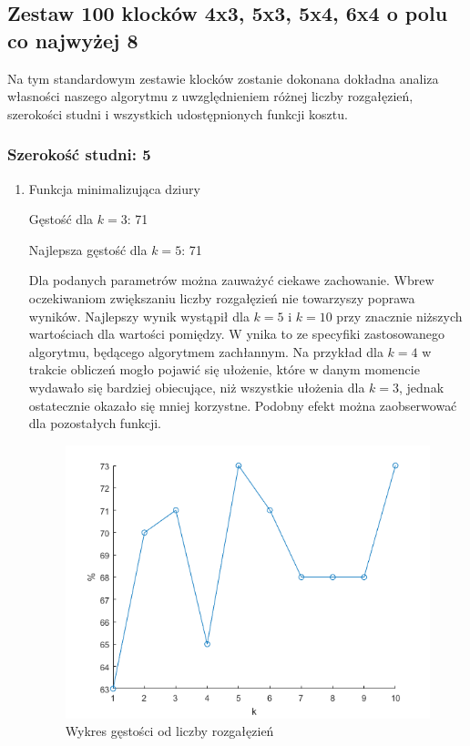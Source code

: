 \documentclass{article}
\begin{document}
\subsection{Zestaw 100 klocków 4x3, 5x3, 5x4, 6x4 o polu co najwyżej 8}
Na tym standardowym zestawie klocków zostanie dokonana dokładna analiza własności naszego algorytmu z uwzględnieniem różnej liczby rozgałęzień, szerokości studni i wszystkich udostępnionych funkcji kosztu.

\subsubsection{Szerokość studni: 5}
\begin{enumerate}
\item Funkcja minimalizująca dziury

Gęstość dla $k=3$: 71

Najlepsza gęstość dla $k=5$: 71

Dla podanych parametrów można zauważyć ciekawe zachowanie. 
Wbrew oczekiwaniom zwiększaniu liczby rozgałęzień nie towarzyszy poprawa wyników. 
Najlepszy wynik wystąpił dla $k=5$ i $k=10$ przy znacznie niższych wartościach dla wartości pomiędzy. W
ynika to ze specyfiki zastosowanego algorytmu, będącego algorytmem zachłannym. 
Na przykład dla $k=4$ w trakcie obliczeń mogło pojawić się ułożenie, które w danym momencie wydawało się bardziej obiecujące, niż wszystkie ułożenia dla $k=3$, jednak ostatecznie okazało się mniej korzystne.
Podobny efekt można zaobserwować dla pozostałych funkcji.

\begin{figure}[H]
\includegraphics[width=\textwidth]{k_plot.png}
\caption{Wykres gęstości od liczby rozgałęzień}
\end{figure}


\end{enumerate}
\end{document}
